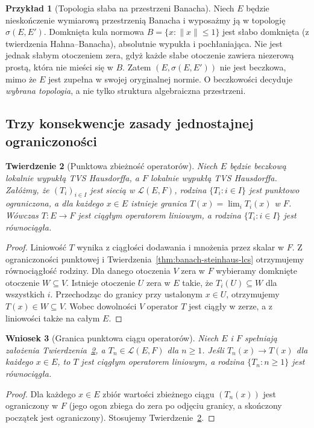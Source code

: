 \documentclass[11pt,a4paper]{article}
\numberwithin{equation}{section}
\theoremstyle{plain}
\newtheorem{twierdzenie}{Twierdzenie}[section]
\newtheorem{wniosek}[twierdzenie]{Wniosek}
\theoremstyle{definition}
\newtheorem{przyklad}[twierdzenie]{Przykład}
\theoremstyle{remark}
\begin{document}
\begin{przyklad}[Topologia słaba na przestrzeni Banacha]
\label{ex:weak-not-barrelled}
Niech $E$ będzie nieskończenie wymiarową przestrzenią Banacha
i wyposażmy ją w topologię $\sigma(E,E')$. Domknięta kula
normowa $B=\{x:\|x\|\le1\}$ jest słabo domknięta
(z twierdzenia Hahna--Banacha), absolutnie wypukła i pochłaniająca.
Nie jest jednak słabym otoczeniem zera, gdyż każde słabe
otoczenie zawiera niezerową prostą, która nie mieści się
w $B$. Zatem $(E,\sigma(E,E'))$ nie jest beczkowa,
mimo że $E$ jest zupełna w swojej oryginalnej normie.
O beczkowości decyduje \emph{wybrana topologia}, a nie tylko
struktura algebraiczna przestrzeni.
\end{przyklad}

\subsection{Trzy konsekwencje zasady jednostajnej ograniczoności}

\begin{twierdzenie}[Punktowa zbieżność operatorów]\label{thm:pointwise-limit-cont}
Niech $E$ będzie beczkową lokalnie wypukłą TVS Hausdorffa,
a $F$ lokalnie wypukłą TVS Hausdorffa. Załóżmy, że
$(T_i)_{i\in I}$ jest siecią w $\mathcal L(E,F)$,
rodzina $\{T_i:i\in I\}$ jest punktowo ograniczona,
a dla każdego $x\in E$ istnieje granica
$T(x)=\lim_iT_i(x)$ w $F$. Wówczas $T:E\to F$
jest ciągłym operatorem liniowym, a rodzina
$\{T_i:i\in I\}$ jest równociągła.
\end{twierdzenie}
\begin{proof}
Liniowość $T$ wynika z ciągłości dodawania i mnożenia
przez skalar w $F$. Z ograniczoności punktowej i
Twierdzenia~\ref{thm:banach-steinhaus-lcs} otrzymujemy
równociągłość rodziny. Dla danego otoczenia $V$ zera
w $F$ wybieramy domknięte otoczenie $W\subseteq V$.
Istnieje otoczenie $U$ zera w $E$ takie, że
$T_i(U)\subseteq W$ dla wszystkich $i$.
Przechodząc do granicy przy ustalonym $x\in U$, otrzymujemy
$T(x)\in W\subseteq V$. Wobec dowolności $V$ operator
$T$ jest ciągły w zerze, a z liniowości także na całym $E$.
\end{proof}

\begin{wniosek}[Granica punktowa ciągu operatorów]
\label{cor:sequence-operators}
Niech $E$ i $F$ spełniają założenia
Twierdzenia~\ref{thm:pointwise-limit-cont}, a
$T_n\in\mathcal L(E,F)$ dla $n\ge1$. Jeśli
$T_n(x)\to T(x)$ dla każdego $x\in E$, to $T$ jest
ciągłym operatorem liniowym, a rodzina $\{T_n:n\ge1\}$
jest równociągła.
\end{wniosek}
\begin{proof}
Dla każdego $x\in E$ zbiór wartości zbieżnego ciągu
$(T_n(x))$ jest ograniczony w $F$ (jego ogon zbiega do zera
po odjęciu granicy, a skończony początek jest ograniczony).
Stosujemy Twierdzenie~\ref{thm:pointwise-limit-cont}.
\end{proof}
\end{document}
